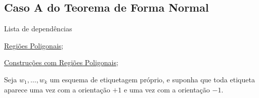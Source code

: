 \subsection{Caso A do Teorema de Forma Normal}
\label{forma-normal-caso-a-thm}
\begin{titlemize}{Lista de dependências}
	\item \hyperref[regiao-poligonal-def]{Regiões Poligonais};\\
	\item \hyperref[construcoes-regiao-poligonal-prop]{Construções com Regiões Poligonais};\\
\end{titlemize}

Seja $w_1,\ldots,w_k$ um esquema de etiquetagem próprio, e suponha que toda etiqueta aparece uma vez com a orientação $+1$ e uma vez com a orientação $-1$.

